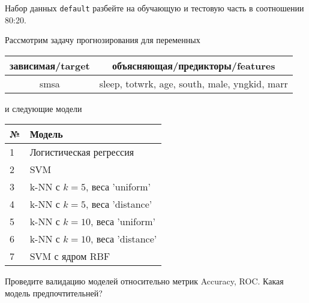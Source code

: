 \begin{exercise}
Набор данных \texttt{default} разбейте на обучающую и тестовую часть
в соотношении 80:20.
	
Рассмотрим задачу прогнозирования для переменных
\begin{center}
	\begin{tabular}{|c|c|}\hline
		зависимая/target & объясняющая/предикторы/features \\ \hline
		smsa & sleep, totwrk, age, south, male, yngkid, marr \\ \hline
	\end{tabular}
\end{center}
и следующие модели
\begin{center}
	\begin{tabular}{|l|l|}\hline
		№ & Модель \\ \hline
		1 & Логистическая регрессия\\
		2 & SVM \\ 
		3 & k-NN с \(k=5\), веса 'uniform' \\
		4 & k-NN с \(k=5\), веса 'distance' \\
		5 & k-NN с \(k=10\), веса 'uniform' \\
		6 & k-NN с \(k=10\), веса 'distance' \\ 
		7 & SVM с ядром RBF \\ \hline
	\end{tabular}
\end{center}
Проведите валидацию моделей относительно метрик Accuracy, ROC. Какая модель предпочтительней?
\end{exercise}